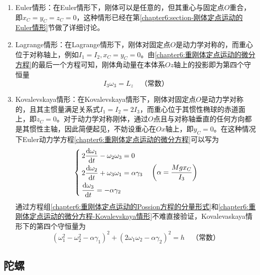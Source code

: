 \begin{enumerate}
\item Euler情形：在Euler情形下，刚体可以是任意的，但其重心与固定点$O$重合，即$x_C=y_C=z_C=0$，这种情形已经在第\ref{chapter6:section-刚体定点运动的Euler情形}节做了详细讨论。

\item Lagrange情形：在Lagrange情形下，刚体对固定点$O$是动力学对称的，而重心位于对称轴上，例如$I_1=I_2, x_C=y_C=0$。由\eqref{chapter6:重刚体定点运动的微分方程}的最后一个方程可知，刚体角动量在本体系$Oz$轴上的投影即为第四个守恒量
\begin{equation}
	I_3\omega_3=L_z\quad \text{（常数）}
\end{equation}

\item Kovalevskaya情形：在Kovalevskaya情形下，刚体对固定点$O$是动力学对称的，且其主惯量满足关系式$I_1=I_2=2I_3$，而重心位于其惯性椭球的赤道面上，即$z_C=0$。对于动力学对称刚体，通过$O$点且与对称轴垂直的任何方向都是其惯性主轴，因此简便起见，不妨设重心在$Ox$轴上，即$y_C=0$。在这种情况下Euler动力学方程\eqref{chapter6:重刚体定点运动的微分方程}可以写为
\begin{equation}
\begin{cases}
	2\dfrac{\mathrm{d} \omega_1}{\mathrm{d} t} - \omega_2 \omega_3 = 0 \\[1.5ex]
	2\dfrac{\mathrm{d} \omega_2}{\mathrm{d} t} + \omega_3 \omega_1 = \alpha\gamma_3 \\[1.5ex]
	\dfrac{\mathrm{d} \omega_3}{\mathrm{d} t} = -\alpha\gamma_2
\end{cases}\left(\alpha=\frac{Mgx_C}{I_3}\right)
\label{chapter6:重刚体定点运动的微分方程-Kovalevskaya情形}
\end{equation}
通过方程组\eqref{chapter6:重刚体定点运动的Possion方程的分量形式}和\eqref{chapter6:重刚体定点运动的微分方程-Kovalevskaya情形}不难直接验证，Kovalevaskaya情形下的第四个守恒量为
\begin{equation}
	(\omega_1^2-\omega_2^2-\alpha\gamma_1)^2+(2\omega_1\omega_2-\alpha\gamma_2)^2=h\quad \text{（常数）}
	\label{chapter6:Kovalevskaya情形的第四个守恒量}
\end{equation}
\end{enumerate}

\subsection{陀螺}


